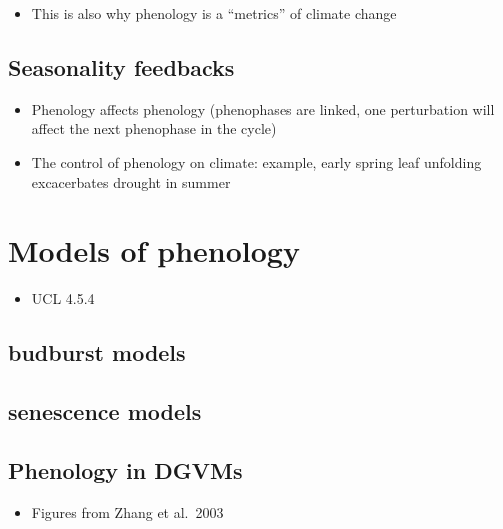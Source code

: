 \documentclass[
  oneside]{book}
\providecommand{\tightlist}{%
  \setlength{\itemsep}{0pt}\setlength{\parskip}{0pt}}
\begin{document}
\begin{itemize}
\tightlist
\item
  This is also why phenology is a ``metrics'' of climate change
\end{itemize}

\hypertarget{seasonality-feedbacks}{%
\subsection{Seasonality feedbacks}\label{seasonality-feedbacks}}

\begin{itemize}
\tightlist
\item
  Phenology affects phenology (phenophases are linked, one perturbation will affect the next phenophase in the cycle)
\item
  The control of phenology on climate: example, early spring leaf unfolding excacerbates drought in summer
\end{itemize}

\hypertarget{models-of-phenology}{%
\section{Models of phenology}\label{models-of-phenology}}

\begin{itemize}
\tightlist
\item
  UCL 4.5.4
\end{itemize}

\hypertarget{budburst-models}{%
\subsection{budburst models}\label{budburst-models}}

\hypertarget{senescence-models}{%
\subsection{senescence models}\label{senescence-models}}

\hypertarget{phenology-in-dgvms}{%
\subsection{Phenology in DGVMs}\label{phenology-in-dgvms}}

\begin{itemize}
\tightlist
\item
  Figures from Zhang et al.~2003
\end{itemize}
\end{document}

